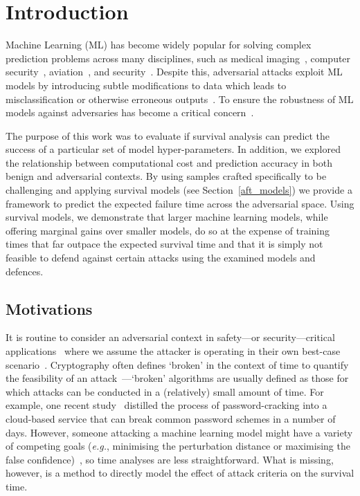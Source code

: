 \section{Introduction}

Machine Learning (ML) has become widely popular for solving complex prediction problems across many disciplines, such as medical imaging~\cite{ai_medical_imaging}, computer security~\cite{ai_security}, 
aviation~\cite{ai_aviation}, and security~\cite{ai_luggage}. Despite this, adversarial attacks exploit ML models by introducing subtle modifications to data which leads to misclassification or otherwise erroneous outputs~\cite{chakraborty_adversarial_2018}. To ensure the robustness of ML models against adversaries has become a critical concern~\cite{adversarialpatch,carlini_towards_2017,hopskipjump,art2018,meyers}.

The purpose of this work was to evaluate if survival analysis can predict the success of a particular set of model hyper-parameters. In addition, we explored the relationship between computational cost and prediction accuracy in both benign and adversarial contexts.  By using samples crafted specifically to be challenging and applying survival models (see Section~\ref{aft_models}) we provide a framework to predict the expected failure time across the adversarial space. Using survival models, we demonstrate that larger machine learning models, while offering marginal gains over smaller models, do so at the expense of training times that far outpace the expected survival time and that it is simply not feasible to defend against certain attacks using the examined models and defences.



\subsection{Motivations}

It is routine to consider an adversarial context in safety---or security---critical applications~\cite{ai_medical_imaging,ai_security,ai_luggage} where we assume the attacker is operating in their own best-case scenario~\cite{leurent2020sha,kamal2017study,madry2017towards,pixelattack,deepfool}. 
Cryptography often defines `broken' in the context of time to quantify the feasibility of an attack~\cite{leurent2020sha}---`broken' algorithms are usually defined as those for which attacks can be conducted in a (relatively) small amount of time. For example, one recent study~\cite{kamal2017study} distilled the process of password-cracking into a cloud-based service that can break common password schemes in a number of days. However, someone attacking a machine learning model might have a variety of competing goals (\textit{e.g.}, minimising the perturbation distance or maximising the false confidence)~\cite{madry2017towards,hopskipjump,pixelattack,fgm,deepfool}, so time analyses are less straightforward. 
What is missing, however, is a method to directly model the effect of attack criteria on the survival time.

